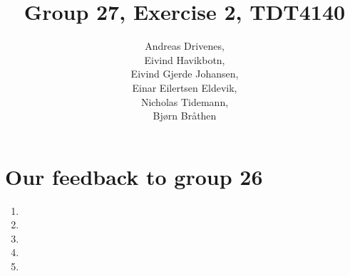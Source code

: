 \documentclass[english, a4paper]{article}
\title{Group 27, Exercise 2, TDT4140}
\author{	Andreas Drivenes,\\
		Eivind Havikbotn,\\
		Eivind Gjerde Johansen,\\
		Einar Eilertsen Eldevik,\\
		Nicholas Tidemann,\\
		Bjørn Bråthen\\
}
\begin{document}

\maketitle

\section{Our feedback to group 26}
\begin{enumerate}

\item{}

\item{}

\item{}

\item{}

\item{}

\end{enumerate}

\end{document}
